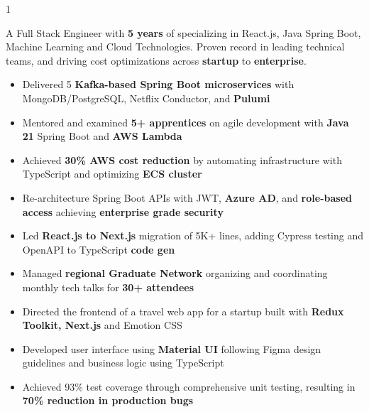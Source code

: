 \documentclass[11pt,a4paper,ragged2e]{altacv}
\begin{document}

\makecvheader


\begin{paracol}{1}
\smallskip
{}

A Full Stack Engineer with \textbf{5 years} of specializing in React.js, Java Spring Boot, Machine Learning and Cloud Technologies. Proven record in leading technical teams, and driving cost optimizations across \textbf{startup} to \textbf{enterprise}.
\smallskip


\begin{itemize}
\item Delivered 5 \textbf{Kafka-based Spring Boot microservices} with MongoDB/PostgreSQL, Netflix Conductor, and \textbf{Pulumi}
\item Mentored and examined \textbf{5+ apprentices} on agile development with \textbf{Java 21} Spring Boot and \textbf{AWS Lambda}
\item Achieved \textbf{30\% AWS cost reduction} by automating infrastructure with TypeScript and optimizing \textbf{ECS cluster}
\item Re-architecture Spring Boot APIs with JWT, \textbf{Azure AD}, and \textbf{role-based access} achieving \textbf{enterprise grade security}
\item Led \textbf{React.js to Next.js} migration of 5K+ lines, adding Cypress testing and OpenAPI to TypeScript \textbf{code gen}
\item Managed \textbf{regional Graduate Network} organizing and coordinating monthly tech talks for \textbf{30+ attendees}
\end{itemize}
\tightdivider

\begin{itemize}
\item Directed the frontend of a travel web app for a startup built with \textbf{Redux Toolkit, Next.js} and Emotion CSS
\item Developed user interface using \textbf{Material UI} following Figma design guidelines and business logic using TypeScript
\item Achieved 93\% test coverage through comprehensive unit testing, resulting in \textbf{70\% reduction in production bugs}
\end{itemize}
\tightdivider


\end{paracol}
\end{document}
